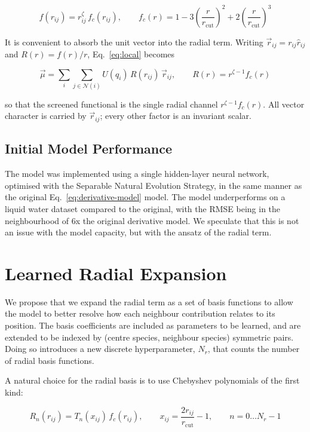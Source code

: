 \documentclass[11pt,a4paper]{article}
\begin{document}
\begin{equation}
    f(r_{ij}) = r_{ij}^{\zeta}\, f_c(r_{ij}),
    \qquad
    f_c(r) = 1 - 3\left(\frac{r}{r_{\mathrm{cut}}}\right)^2 + 2\left(\frac{r}{r_{\mathrm{cut}}}\right)^3
\end{equation}

It is convenient to absorb the unit vector into the radial term. Writing
$\vec{r}_{ij} = r_{ij}\hat{r}_{ij}$ and
$R(r) = f(r)/r$, Eq.~\ref{eq:local} becomes

\begin{equation}
    \vec{\mu} = \sum_i \sum_{j \in \mathcal{N}(i)} U(q_i)\, R(r_{ij})\, \vec{r}_{ij},
    \qquad R(r) = r^{\zeta-1} f_c(r)
    \label{eq:disp}
\end{equation}

so that the screened functional is the single radial channel $r^{\zeta-1}f_c(r)$.
All vector character is carried by $\vec{r}_{ij}$; every other factor is an
invariant scalar.

\subsection{Initial Model Performance}

The model was implemented using a single hidden-layer neural network, optimised with the Separable Natural Evolution Strategy, in the same manner as the original Eq.~\ref{eq:derivative-model} model. The model underperforms on a liquid water dataset compared to the original, with the RMSE being in the neighbourhood of 6x the original derivative model. We speculate that this is not an issue with the model capacity, but with the ansatz of the radial term.

\section{Learned Radial Expansion}

We propose that we expand the radial term as a set of basis functions to allow the model to better resolve how each neighbour contribution relates to its position. The basis coefficients are included as parameters to be learned, and are extended to be indexed by (centre species, neighbour species) symmetric pairs. Doing so introduces a new discrete hyperparameter, $N_r$, that counts the number of radial basis functions.

A natural choice for the radial basis is to use Chebyshev polynomials of the
first kind:

\begin{equation}
    R_n(r_{ij}) = T_n(x_{ij})\, f_c(r_{ij}),
    \qquad
    x_{ij} = \frac{2 r_{ij}}{r_{\mathrm{cut}}} - 1,
    \qquad n = 0 \ldots N_r - 1
    \label{eq:cheb}
\end{equation}
\end{document}
